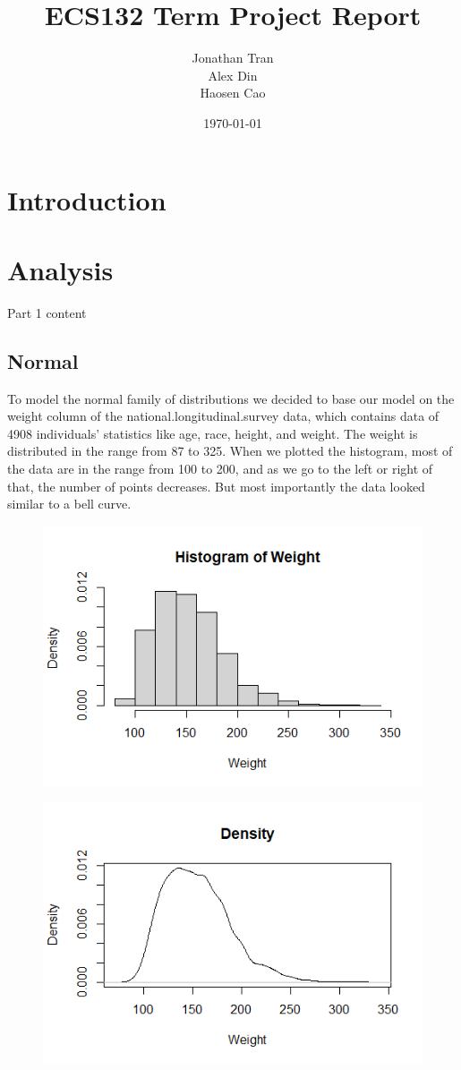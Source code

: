 \documentclass[12pt, a4paper, oneside]{report}
\title{ECS132 Term Project Report}
\author{Jonathan Tran\\Alex Din\\Haosen Cao}
\date{\today}
\begin{document}
\maketitle
\tableofcontents
\newpage

\chapter{Introduction}

\newpage





\chapter{Analysis}
Part 1 content
\newpage





\newpage
\section{Normal}
To model the normal family of distributions we decided to base our model on the weight column of the national.longitudinal.survey data, which contains data of 4908 individuals' statistics like age, race, height, and weight. The weight is distributed in the range from 87 to 325. When we plotted the histogram, most of the data are in the range from 100 to 200, and as we go to the left or right of that, the number of points decreases. But most importantly the data looked similar to a bell curve.

\begin{figure}[h]
  \centering
  \includegraphics[width=0.7\linewidth]{normHist.png}
\end{figure}

\begin{figure}[h]
  \centering
  \includegraphics[width=0.7\linewidth]{normDensity.png}
\end{figure}
\end{document}
